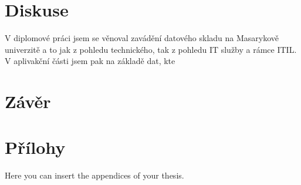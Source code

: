 \documentclass[
  digital,     %
  twoside,     %
  lof,         %
  lot,         %
]{fithesis4}
\begin{document}
\chapter{Diskuse}
V diplomové práci jsem se věnoval zavádění datového skladu na Masarykově univerzitě a to jak z pohledu technického, tak z pohledu IT služby a rámce ITIL. V aplivakční části jsem pak na základě dat, kte
\chapter{Závěr}

\printbibliography[heading=bibintoc] %

  \makeatletter\thesis@blocks@clear\makeatother
  \printindex

\appendix %
\chapter{Přílohy}
Here you can insert the appendices of your thesis.
\end{document}

